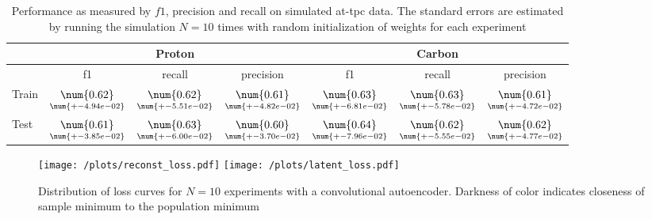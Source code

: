 \begin{table}
\begin{tabular}{l|ccc|ccc}
 & \multicolumn{3}{c}{Proton} & \multicolumn{3}{c}{Carbon} \\
 \hline
 & f1 & recall & precision & f1 & recall & precision\\
 Train & $ \underset{ \num{+- 4.94e-02 } } {\num{ 0.62 } }  $ & $ \underset{ \num{+- 5.51e-02 } } {\num{ 0.62 } }  $ & $ \underset{ \num{+- 4.82e-02 } } {\num{ 0.61 } }  $ & $ \underset{ \num{+- 6.81e-02 } } {\num{ 0.63 } }  $ & $ \underset{ \num{+- 5.78e-02 } } {\num{ 0.63 } }  $ & $ \underset{ \num{+- 4.72e-02 } } {\num{ 0.61 } }  $ \\
  Test & $ \underset{ \num{+- 3.85e-02 } } {\num{ 0.61 } }  $ & $ \underset{ \num{+- 6.00e-02 } } {\num{ 0.63 } }  $ & $ \underset{ \num{+- 3.70e-02 } } {\num{ 0.60 } }  $ & $ \underset{ \num{+- 7.96e-02 } } {\num{ 0.64 } }  $ & $ \underset{ \num{+- 5.55e-02 } } {\num{ 0.62 } }  $ & $ \underset{ \num{+- 4.77e-02 } } {\num{ 0.62 } }  $
\end{tabular}
\caption{Performance as measured by $f1$, precision and recall on simulated at-tpc data. The standard errors are estimated by running the simulation $N=10$ times with random initialization of weights for each experiment }\label{tab:clf_simulated}
\end{table}

\begin{figure}
\centering
\texttt{[image: /plots/reconst\_loss.pdf]}
\texttt{[image: /plots/latent\_loss.pdf]}
\caption{Distribution of loss curves for $N=10$ experiments with a convolutional autoencoder. Darkness of color indicates closeness of sample minimum to the population minimum}\label{fig:sim_clf_loss}
\end{figure}